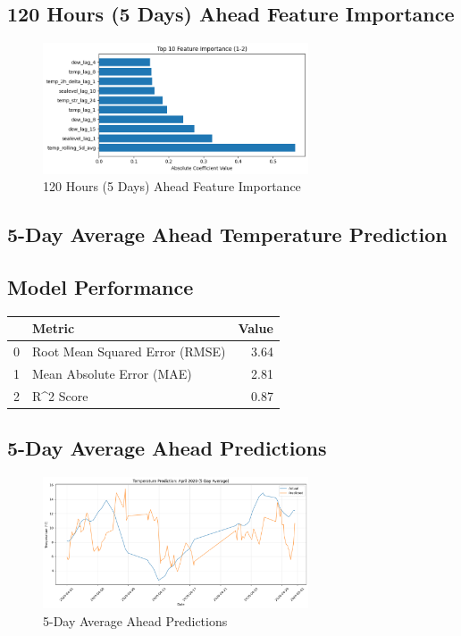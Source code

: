 \subsection{120 Hours (5 Days) Ahead Feature Importance}
\begin{figure}[htbp]
\centering
\includegraphics[width=0.7\textwidth]{1-2-linear_temp_shift_feature_importance.png}
\caption{120 Hours (5 Days) Ahead Feature Importance}
\label{fig:120_hours_(5_days)_ahead_featimp}
\end{figure}



\subsection{5-Day Average Ahead Temperature Prediction}
\subsection{Model Performance}
\begin{tabular}{llr}
\toprule
 & Metric & Value \\
\midrule
0 & Root Mean Squared Error (RMSE) & 3.64 \\
1 & Mean Absolute Error (MAE) & 2.81 \\
2 & R^2 Score & 0.87 \\
\bottomrule
\end{tabular}

\subsection{5-Day Average Ahead Predictions}
\begin{figure}[htbp]
\centering
\includegraphics[width=0.7\textwidth]{1-3-linear_temp_shift_results.png}
\caption{5-Day Average Ahead Predictions}
\label{fig:5-day_average_ahead_pred}
\end{figure}

